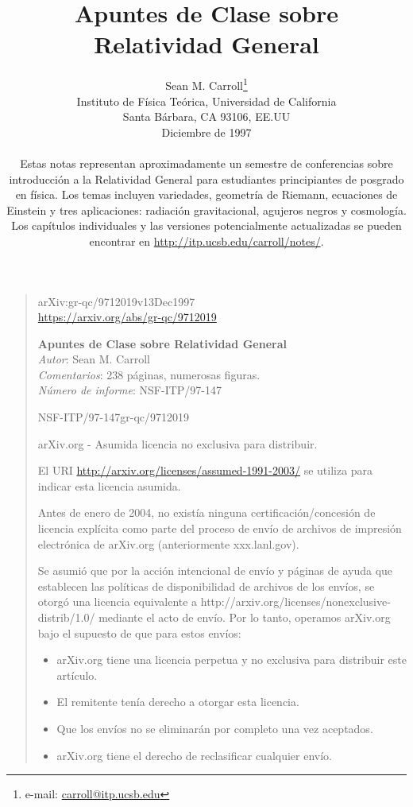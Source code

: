 \documentclass[11pt,b5paper,openany,twoside]{book}
\title{\textcolor{GrisAzul}{{\Huge \textbf{Apuntes de Clase sobre\\[6mm] Relatividad General}}}}
\author{Sean M. Carroll\hspace{2pt}\thanks{e-mail: \href{carroll@itp.ucsb.edu}{carroll@itp.ucsb.edu}} \\[14mm]
Instituto de Física Teórica, Universidad de California \\
Santa Bárbara, CA 93106, EE.UU \\[2mm]
Diciembre de 1997 \\[10mm]
\parbox{10.6cm}{Estas notas representan aproximadamente un semestre de conferencias sobre introducción a la Relatividad General para estudiantes principiantes de posgrado en física.
Los temas incluyen variedades, geometría de Riemann, ecuaciones de Einstein y tres aplicaciones: radiación gravitacional, agujeros negros y cosmología.
Los capítulos individuales y las versiones potencialmente actualizadas se pueden encontrar en \href{http://itp.ucsb.edu/carroll/notes/}{http://itp.ucsb.edu/carroll/notes/}.}
}
\date{}
\begin{document}
\thispagestyle{plain}

\frontmatter

\maketitle

\begin{quote}
{\footnotesize
\noindent
arXiv:gr-qc/9712019v13Dec1997 \\ \href{https://arxiv.org/abs/gr-qc/9712019}{https://arxiv.org/abs/gr-qc/9712019}

\noindent
\textbf{Apuntes de Clase sobre Relatividad General}\\
\textit{Autor}: Sean M. Carroll \\
\textit{Comentarios}: 238 páginas, numerosas figuras. \\
\textit{Número de informe}: NSF-ITP/97-147

{{NSF-ITP/97-147}\hfill{gr-qc/9712019}}


arXiv.org - Asumida licencia no exclusiva para distribuir.

El URI \href{http://arxiv.org/licenses/assumed-1991-2003/}{http://arxiv.org/licenses/assumed-1991-2003/} se utiliza para indicar esta licencia asumida.

Antes de enero de 2004, no existía ninguna certificación/concesión de licencia explícita como parte del proceso de envío de archivos de impresión electrónica de arXiv.org (anteriormente xxx.lanl.gov).

Se asumió que por la acción intencional de envío y páginas de ayuda que establecen las políticas de disponibilidad de archivos de los envíos, se otorgó una licencia equivalente a http://arxiv.org/licenses/nonexclusive-distrib/1.0/ mediante el acto de envío. Por lo tanto, operamos arXiv.org bajo el supuesto de que para estos envíos:

\begin{itemize}
\item arXiv.org tiene una licencia perpetua y no exclusiva para distribuir este artículo.
\item El remitente tenía derecho a otorgar esta licencia.
\item Que los envíos no se eliminarán por completo una vez aceptados.
\item arXiv.org tiene el derecho de reclasificar cualquier envío.
\end{itemize}

}
\end{quote}
\end{document}
